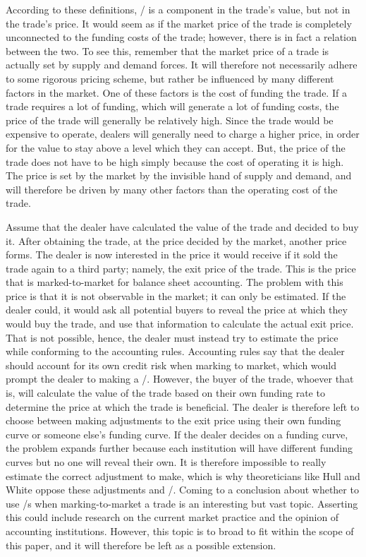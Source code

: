 \documentclass[main.tex]{subfiles}
\begin{document}
    According to these definitions, 
    \FVA/ is a component in the trade's value, but not in the trade's price. 
    It would seem as if the market price of the trade 
    is completely unconnected to the funding costs of the trade;
    however, there is in fact a relation between the two. 
    To see this, remember that the market price of a trade 
    is actually set by supply and demand forces.
    It will therefore not necessarily adhere to some rigorous pricing scheme,
    but rather be influenced by many different factors in the market.
    One of these factors is the cost of funding the trade.
    If a trade requires a lot of funding, which will generate a lot of funding costs,
    the price of the trade will generally be relatively high.
    Since the trade would be expensive to operate, 
    dealers will generally need to charge a higher price, 
    in order for the value to stay above a level which they can accept.
    But, the price of the trade does not have to be high 
    simply because the cost of operating it is high.
    The price is set by the market by the invisible hand of supply and demand,
    and will therefore be driven by many other factors than the operating cost of the trade.

    Assume that the dealer have calculated the value of the trade and decided to buy it.
    After obtaining the trade, at the price decided by the market, another price forms. 
    The dealer is now interested in the price it would receive 
    if it sold the trade again to a third party; namely, the exit price of the trade.
    This is the price that is marked-to-market for balance sheet accounting.
    The problem with this price is that it is not observable in the market; it can only be estimated.
    If the dealer could, it would ask all potential buyers to reveal the price 
    at which they would buy the trade, and use that information to calculate the actual exit price.
    That is not possible, hence, the dealer must instead try to estimate the price
    while conforming to the accounting rules.
    Accounting rules say that the dealer should account for its own credit risk 
    when marking to market, which would prompt the dealer to making a \DVA/.
    However, the buyer of the trade, whoever that is, will calculate the value of the trade
    based on their own funding rate to determine the price at which the trade is beneficial.
    The dealer is therefore left to choose between making adjustments to the exit price
    using their own funding curve or someone else's funding curve.
    If the dealer decides on a funding curve, the problem expands further
    because each institution will have different funding curves but no one will reveal their own.
    It is therefore impossible to really estimate the correct adjustment to make,
    which is why theoreticians like Hull and White oppose these adjustments and \FVA/.
    Coming to a conclusion about whether to use \FVA/s when marking-to-market a trade
    is an interesting but vast topic.
    Asserting this could include research on the current market practice and
    the opinion of accounting institutions.
    However, this topic is to broad to fit within the scope of this paper,
    and it will therefore be left as a possible extension.
\end{document}
